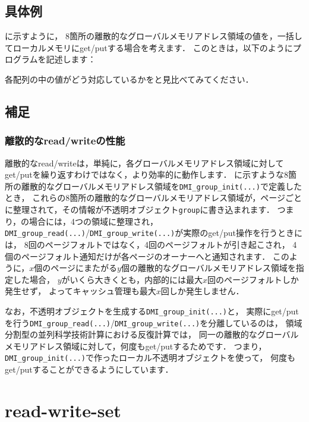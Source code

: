 \documentclass[report,12pt]{jsbook}
\begin{document}
\subsection{具体例}

に示すように，
8箇所の離散的なグローバルメモリアドレス領域の値を，一括してローカルメモリにget/putする場合を考えます．
このときは，以下のようにプログラムを記述します：
\begin{code}
  
\end{code}
各配列の中の値がどう対応しているかをと見比べてみてください．

\subsection{補足}

\subsubsection{離散的なread/writeの性能}

離散的なread/writeは，単純に，各グローバルメモリアドレス領域に対してget/putを繰り返すわけではなく，より効率的に動作します．
に示すような8箇所の離散的なグローバルメモリアドレス領域を\texttt{DMI\_group\_init(...)}で定義したとき，
これらの8箇所の離散的なグローバルメモリアドレス領域が，ページごとに整理されて，その情報が不透明オブジェクト\texttt{group}に書き込まれます．
つまり，の場合には，4つの領域に整理され，
\texttt{DMI\_group\_read(...)}/\texttt{DMI\_group\_write(...)}が実際のget/put操作を行うときには，
8回のページフォルトではなく，4回のページフォルトが引き起こされ，
4個のページフォルト通知だけが各ページのオーナーへと通知されます．
このように，$x$個のページにまたがる$y$個の離散的なグローバルメモリアドレス領域を指定した場合，
$y$がいくら大きくとも，内部的には最大$x$回のページフォルトしか発生せず，
よってキャッシュ管理も最大$x$回しか発生しません．

なお，不透明オブジェクトを生成する\texttt{DMI\_group\_init(...)}と，
実際にget/putを行う\texttt{DMI\_group\_read(...)}/\texttt{DMI\_group\_write(...)}を分離しているのは，
領域分割型の並列科学技術計算における反復計算では，
同一の離散的なグローバルメモリアドレス領域に対して，何度もget/putするためです．
つまり，\texttt{DMI\_group\_init(...)}で作ったローカル不透明オブジェクトを使って，
何度もget/putすることができるようにしています．


\section{read-write-set}
\end{document}
